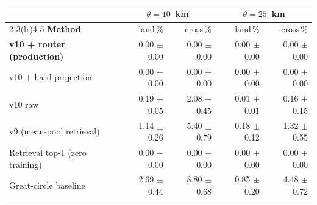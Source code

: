 \begin{tabular}{lrrrr}
\toprule
 & \multicolumn{2}{c}{$\theta = 10$~km} & \multicolumn{2}{c}{$\theta = 25$~km} \\
\cmidrule(lr){2-3}\cmidrule(lr){4-5}
\textbf{Method} & land\,\% & cross\,\% & land\,\% & cross\,\% \\
\midrule
\textbf{v10 + router (production)} & 0.00 $\pm$ 0.00 & 0.00 $\pm$ 0.00 & 0.00 $\pm$ 0.00 & 0.00 $\pm$ 0.00 \\
v10 + hard projection & 0.00 $\pm$ 0.00 & 0.00 $\pm$ 0.00 & 0.00 $\pm$ 0.00 & 0.00 $\pm$ 0.00 \\
v10 raw & 0.19 $\pm$ 0.05 & 2.08 $\pm$ 0.45 & 0.01 $\pm$ 0.01 & 0.16 $\pm$ 0.15 \\
v9 (mean-pool retrieval) & 1.14 $\pm$ 0.26 & 5.40 $\pm$ 0.79 & 0.18 $\pm$ 0.12 & 1.32 $\pm$ 0.55 \\
Retrieval top-1 (zero training) & 0.00 $\pm$ 0.00 & 0.00 $\pm$ 0.00 & 0.00 $\pm$ 0.00 & 0.00 $\pm$ 0.00 \\
Great-circle baseline & 2.69 $\pm$ 0.44 & 8.80 $\pm$ 0.68 & 0.85 $\pm$ 0.20 & 4.48 $\pm$ 0.72 \\
\bottomrule
\end{tabular}
